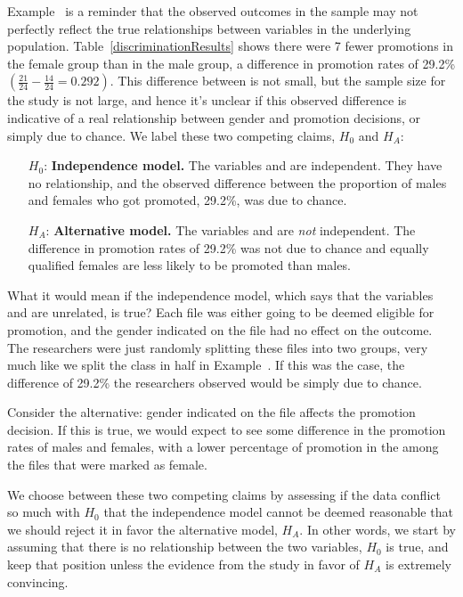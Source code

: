 Example~ is a reminder that the observed outcomes in the sample may not perfectly reflect the true relationships between variables in the underlying population. Table~\ref{discriminationResults} shows there were 7 fewer promotions in the female group than in the male group, a difference in promotion rates of 29.2\% $\left( \frac{21}{24} - \frac{14}{24} = 0.292 \right)$. This difference between is not small, but the sample size for the study is not large, and hence it's unclear if this observed difference is indicative of a real relationship between gender and promotion decisions, or simply due to chance. We label these two competing claims, $H_0$ and $H_A$:
\begin{itemize}
\setlength{\itemsep}{0mm}
\item[$H_0$:] \textbf{Independence model.} The variables  and  are independent. They have no relationship, and the observed difference between the proportion of males and females who got promoted, 29.2\%, was due to chance.
\item[$H_A$:] \textbf{Alternative model.} The variables  and  are \emph{not} independent. The difference in promotion rates of 29.2\% was not due to chance and equally qualified females are less likely to be promoted than males.
\end{itemize}

What it would mean if the independence model, which says that the variables  and  are unrelated, is true? Each file was either going to be deemed eligible for promotion, and the gender indicated on the file had no effect on the outcome. The researchers were just randomly splitting these files into two groups, very much like we split the class in half in Example~. If this was the case, the difference of 29.2\% the researchers observed would be simply due to chance.

Consider the alternative: gender indicated on the file affects the promotion decision. If this is true, we would expect to see some difference in the promotion rates of males and females, with a lower percentage of promotion in the among the files that were marked as female.

We choose between these two competing claims by assessing if the data conflict so much with $H_0$ that the independence model cannot be deemed reasonable that we should reject it in favor the alternative model, $H_A$. In other words, we start by assuming that there is no relationship between the two variables, $H_0$ is true, and keep that position unless the evidence from the study in favor of $H_A$ is extremely convincing.

